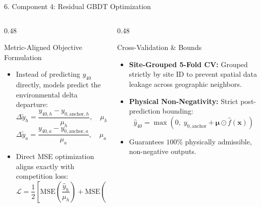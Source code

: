 \documentclass[aspectratio=169,10pt]{beamer}
\begin{document}
\begin{frame}{6. Component 4: Residual GBDT Optimization}
\begin{columns}[T]
    \begin{column}{0.48\textwidth}
        \begin{block}{Metric-Aligned Objective Formulation}
        \begin{itemize}
            \item Instead of predicting $y_{40}$ directly, models predict the environmental delta departure:
            \begin{equation*}
                \Delta \tilde{y}_h = \frac{y_{40,h} - y_{0,\text{anchor},h}}{\mu_h}, \quad \mu_h = 10.90645
            \end{equation*}
            \begin{equation*}
                \Delta \tilde{y}_a = \frac{y_{40,a} - y_{0,\text{anchor},a}}{\mu_a}, \quad \mu_a = 3.39567
            \end{equation*}
            \item Direct MSE optimization aligns exactly with competition loss:
            \begin{equation*}
                \mathcal{L} = \frac{1}{2} \left[ \text{MSE}\left(\frac{\hat{y}_h}{\mu_h}\right) + \text{MSE}\left(\frac{\hat{y}_a}{\mu_a}\right) \right]
            \end{equation*}
        \end{itemize}
        \end{block}
    \end{column}
    \begin{column}{0.48\textwidth}
        \begin{block}{Cross-Validation \& Bounds}
        \begin{itemize}
            \item \textbf{Site-Grouped 5-Fold CV:} Grouped strictly by site ID to prevent spatial data leakage across geographic neighbors.
            \item \textbf{Physical Non-Negativity:} Strict post-prediction bounding:
            \begin{equation*}
                \hat{y}_{40} = \max\left(0, \; y_{0,\text{anchor}} + \boldsymbol{\mu} \odot \hat{f}(\mathbf{x})\right)
            \end{equation*}
            \item Guarantees $100\%$ physically admissible, non-negative outputs.
        \end{itemize}
        \end{block}
    \end{column}
\end{columns}
\end{frame}
\end{document}
